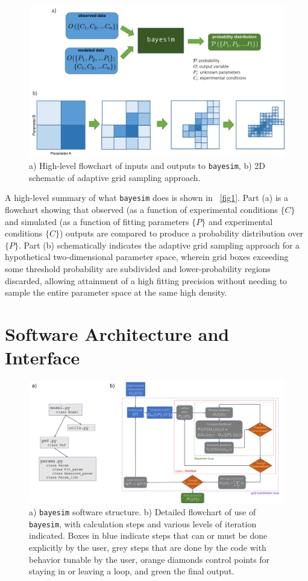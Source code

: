 \documentclass[aps,prl,amsmath,amssymb,superscriptaddress,notitlepage,groupedaddress]{revtex4-1}
\begin{document}
 \begin{figure}
   \includegraphics[width=0.9\columnwidth]{figure_1.png}
   \caption{a) High-level flowchart of inputs and outputs to \texttt{bayesim}, b) 2D schematic of adaptive grid sampling approach.}
   \label{fig1}
 \end{figure}

 A high-level summary of what \texttt{bayesim} does is shown in ~\autoref{fig1}. Part (a) is a flowchart showing that observed (as a function of experimental conditions $\{C\}$ and simulated (as a function of fitting parameters $\{P\}$ and experimental conditions $\{C\}$) outputs are compared to produce a probability distribution over $\{P\}$. Part (b) schematically indicates the adaptive grid sampling approach for a hypothetical two-dimensional parameter space, wherein grid boxes exceeding some threshold probability are subdivided and lower-probability regions discarded, allowing attainment of a high fitting precision without needing to sample the entire parameter space at the same high density.

\section*{Software Architecture and Interface}

  \begin{figure}
    \includegraphics[width=0.95\columnwidth]{figure_2.png}
    \caption{a) \texttt{bayesim} software structure. b) Detailed flowchart of use of \texttt{bayesim}, with calculation steps and various levels of iteration indicated. Boxes in blue indicate steps that can or must be done explicitly by the user, grey steps that are done by the code with behavior tunable by the user, orange diamonds control points for staying in or leaving a loop, and green the final output.}
    \label{structure}
  \end{figure}
\end{document}
